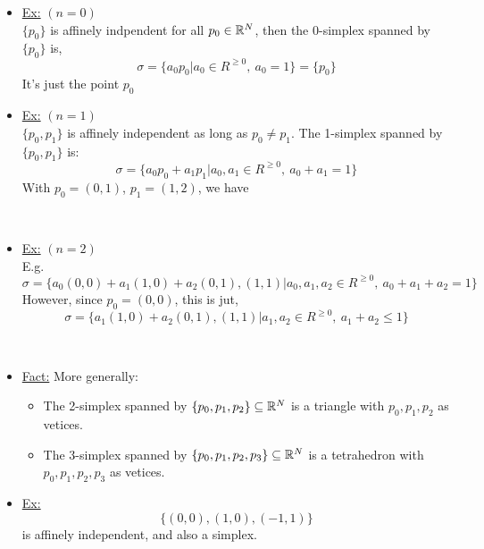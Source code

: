 \documentclass[../notes.tex]{subfiles}
\begin{document}
\begin{itemize}
    \item\underline{Ex:} $(n=0)$\\
        $\{p_0\}$ is affinely indpendent for all $p_0\in \mathbb{R}^N$, then the 0-simplex spanned by
        $\{p_0\}$ is,
        \[
            \sigma = \{a_0p_0| a_0\in R^{\geq 0},\ a_0=1\}=\{p_0\}
        \]
        It's just the point $p_0$
    \item\underline{Ex:} $(n=1)$\\
        $\{p_0,p_1\}$ is affinely independent as long as $p_0\neq p_1$. The
        1-simplex spanned by $\{p_0,p_1\}$ is:
        \[
            \sigma = \{a_0p_0+a_1p_1| a_0,a_1\in R^{\geq 0},\ a_0+a_1=1\}
        \]
        With $p_0=(0,1)$, $p_1=(1,2)$, we have\\
        \\
    \item\underline{Ex:} $(n=2)$\\
        E.g.
        \[
            \sigma=\{a_0(0,0)+a_1(1,0)+a_2(0,1), (1,1)| 
            a_0,a_1,a_2\in R^{\geq 0},\ a_0+a_1+a_2=1\}
        \]
        However, since $p_0=(0,0)$, this is jut,
        \[
            \sigma=\{a_1(1,0)+a_2(0,1), (1,1)| 
            a_1,a_2\in R^{\geq 0},\ a_1+a_2\leq1\}
        \]
        \\
    \item \underline{Fact:} More generally:
        \begin{itemize}
            \item The 2-simplex spanned by $\{p_0,p_1,p_2\}\subseteq\mathbb{R}^N$ is a triangle
                with $p_0,p_1,p_2$ as vetices.
            \item The 3-simplex spanned by $\{p_0,p_1,p_2,p_3\}\subseteq\mathbb{R}^N$ is a 
                tetrahedron with $p_0,p_1,p_2,p_3$ as vetices.
        \end{itemize}
    \item \underline{Ex:}
        \[
            \{(0,0), (1,0), (-1,1)\}
        \]
        is affinely independent, and also a simplex.
\end{itemize}
\end{document}
